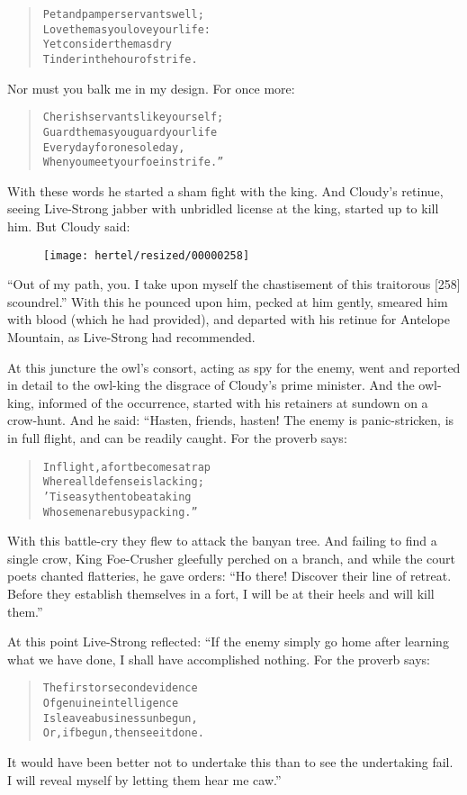 \documentclass[article, twoside, 10pt]{memoir}
\renewenvironment{verbatim}{%
\begin{quote}%
\vskip -10pt%
\begin{alltt}\normalfont\small}{\end{alltt}%
\end{quote}%
\vskip -10pt
} %
\begin{document}
\begin{verbatim}
Pet and pamper servants well;
    Love them as you love your life:
Yet consider them as dry
    Tinder in the hour of strife.
\end{verbatim}
Nor must you balk me in my design. For once more:

\begin{verbatim}
Cherish servants like yourself;
    Guard them as you guard your life
Every day for one sole day,
    When you meet your foe in strife.”
\end{verbatim}
With these words he started a sham fight with the king. And
Cloudy's retinue, seeing Live-Strong jabber with unbridled license
at the king, started up to kill him. But Cloudy said:
\begin{figure}[p]\texttt{[image: hertel/resized/00000258]}\end{figure}``Out of my path, you. I take upon myself the chastisement of this traitorous [258] scoundrel.''
With this he pounced upon him, pecked at him gently, smeared him
with blood (which he had provided), and departed with his retinue
for Antelope Mountain, as Live-Strong had recommended.

At this juncture the owl's consort, acting as spy for the enemy,
went and reported in detail to the owl-king the disgrace of
Cloudy's prime minister. And the owl-king, informed of the
occurrence, started with his retainers at sundown on a crow-hunt.
And he said: “Hasten, friends, hasten! The enemy is panic-stricken,
is in full flight, and can be readily caught. For the proverb
says:

\begin{verbatim}
In flight, a fort becomes a trap
    Where all defense is lacking;
'Tis easy then to beat a king
    Whose men are busy packing.”
\end{verbatim}
With this battle-cry they flew to attack the banyan tree. And
failing to find a single crow, King Foe-Crusher gleefully perched
on a branch, and while the court poets chanted flatteries, he gave
orders:
``Ho there! Discover their line of retreat. Before they establish themselves in a fort, I will be at their heels and will kill them.''

At this point Live-Strong reflected: “If the enemy simply go home
after learning what we have done, I shall have accomplished
nothing. For the proverb says:

\begin{verbatim}
The first or second evidence
Of genuine intelligence
Is{\textemdash}leave a business unbegun,
Or, if begun, then see it done.
\end{verbatim}
It would have been better not to undertake this than to see the
undertaking fail. I will reveal myself by letting them hear me
caw.”
\end{document}
